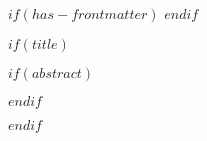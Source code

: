 $if(has-frontmatter)$
\frontmatter
$endif$

$if(title)$

\maketitle

$if(abstract)$
\begin{abstract}
$abstract$
\end{abstract}
$endif$

$endif$

\let\mainmattertmp\mainmatter
\let\mainmatter\relax
